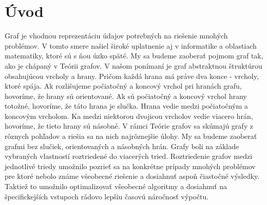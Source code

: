 {}
\chapter*{Úvod}\label{chap:intro}

Graf je vhodnou reprezentáciu údajov potrebných na riešenie mnohých problémov.
V tomto smere našiel široké uplatnenie aj v informatike a oblastiach 
matematiky, ktoré sú s ňou úzko späté.
My sa budeme zaoberať pojmom graf tak, ako je chápaný v Teórii grafov.
V našom ponímaní je graf abstraktnou štruktúrou obsahujúcou vrcholy a hrany.
Pričom každá hrana má práve dva konce - vrcholy, ktoré spája. Ak rozlišujeme
počiatočný a koncový vrchol pri hranách grafu, hovoríme, že hrany sú
orientované. Ak sú počiatočný a koncový vrchol hrany totožné, hovoríme, že
táto hrana je slučka. Hrana vedie medzi počiatočným a koncovým vrcholom. Ka
medzi niektorou dvojicou vrcholov vedie viacero hrán, hovoríme, že tieto
hrany sú násobné.
V rámci Teórie grafov sa skúmajú grafy z rôznych pohľadov a riešia sa na 
nich najrôznejšie úlohy. My sa budeme zaoberať grafmi bez slučiek,
orientovaných a násobných hrán.
Grafy boli na základe vybraných vlastností roztriedené do viacerých tried.
Roztriedenie grafov medzi jednotlivé triedy umožnilo 
pozrieť sa na konkrétne prípady mnohých problémov pre ktoré nebolo známe 
všeobecné riešenie a dosiahnuť aspoň čiastočné výsledky. Taktiež to umožnilo 
optimalizovať všeobecné algoritmy a dosiahnuť na špecifickejších vstupoch 
rádovo lepšiu časovú náročnosť výpočtu.


